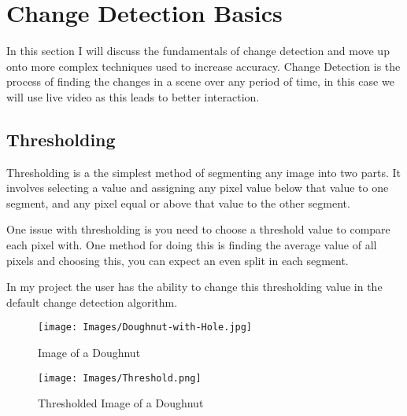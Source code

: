 \documentclass[a4paper]{report}
\begin{document}
\section{Change Detection Basics}
In this section I will discuss the fundamentals of change detection and move up onto more complex techniques used to increase accuracy. Change Detection is the process of finding the changes in a scene over any period of time, in this case we will use live video as this leads to better interaction.

\subsection{Thresholding}
Thresholding is a the simplest method of segmenting any image into two parts. It involves selecting a value and assigning any pixel value below that value to one segment, and any pixel equal or above that value to the other segment.

One issue with thresholding is you need to choose a threshold value to compare each pixel with. One method for doing this is finding the average value of all pixels and choosing this, you can expect an even split in each segment.

In my project the user has the ability to change this thresholding value in the default change detection algorithm.

\clearpage
\begin{figure}[!ht]
\centering
\texttt{[image: Images/Doughnut-with-Hole.jpg]}
\caption{\label{fig:Doughnut} Image of a Doughnut}
\end{figure}

\begin{figure}[!ht]
\centering
\texttt{[image: Images/Threshold.png]}
\caption{\label{fig:Doughnut} Thresholded Image of a Doughnut}
\end{figure}
\end{document}
